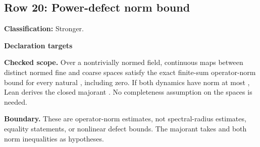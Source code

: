 \subsection{Row 20: Power-defect norm bound}
\label{row:20}
\textbf{Classification:} Stronger.
\par\smallskip\textbf{Declaration targets}\par
{\small\noindent{}\par}
{\small\noindent{}\par}
{\small\noindent{}\par}
{\small\noindent{}\par}
{\small\noindent{}\par}
{\small\noindent{}\par}
{\small\noindent{}\par}
\smallskip\textbf{Checked scope.} Over a nontrivially normed field, continuous maps between distinct normed fine and coarse spaces satisfy the exact finite-sum operator-norm bound for every natural , including zero. If both dynamics have norm at most , Lean derives the closed majorant . No completeness assumption on the spaces is needed.
\par\smallskip\textbf{Boundary.} These are operator-norm estimates, not spectral-radius estimates, equality statements, or nonlinear defect bounds. The majorant takes  and both norm inequalities as hypotheses.
\medskip
{}
